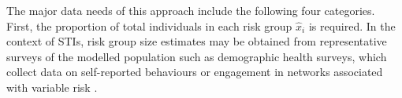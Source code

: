 \par
The major data needs of this approach include the following four categories.
First, the proportion of total individuals in each risk group $\hat{x}_i$ is required.
In the context of STIs, risk group size estimates may be
obtained from representative surveys of the modelled population
such as demographic health surveys, which collect data on
self-reported behaviours or engagement in networks associated with variable risk \citep{DHS}.
